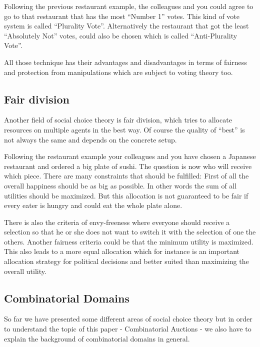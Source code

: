 \documentclass[a4paper]{paper}
\begin{document}
Following the previous restaurant example, the colleagues and you could agree to go to that restaurant that has the most ``Number 1'' votes. This kind of vote system is called ``Plurality Vote''. Alternatively the restaurant that got the least ``Absolutely Not'' votes, could also be chosen which is called ``Anti-Plurality Vote''.

All those technique has their advantages and disadvantages in terms of fairness and protection from manipulations which are subject to voting theory too.~\cite[Chapter~3]{BCE12}

\subsection{Fair division}

Another field of social choice theory is fair division, which tries to allocate resources on multiple agents in the best way. Of course the quality of ``best'' is not always the same and depends on the concrete setup.

Following the restaurant example your colleagues and you have chosen a Japanese restaurant and ordered a big plate of sushi. The question is now who will receive which piece. There are many constraints that should be fulfilled: First of all the overall happiness should be as big as possible. In other words the sum of all utilities should be maximized. But this allocation is not guaranteed to be fair if every eater is hungry and could eat the whole plate alone.

There is also the criteria of envy-freeness where everyone should receive a selection so that he or she does not want to switch it with the selection of one the others. Another fairness criteria could be that the minimum utility is maximized. This also leads to a more equal allocation which for instance is an important allocation strategy for political decisions and better suited than maximizing the overall utility.~\cite[Chapter~5]{BCE12}

\subsection{Combinatorial Domains}

So far we have presented some different areas of social choice theory but in order to understand the topic of this paper - Combinatorial Auctions - we also have to explain the background of combinatorial domains in general.
\end{document}

